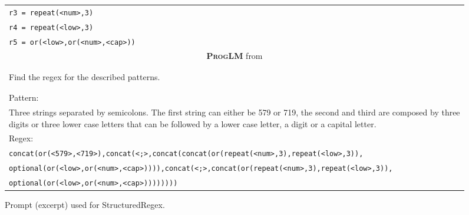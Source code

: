 \documentclass{article}
\theoremstyle{definition}
\newcommand{\pallm}{\textsc{ProgLM}}
\begin{document}
\begin{figure}[h]
\begin{tabularx}{\linewidth}{X}
\tt r3 = repeat(<num>,3) \\
\tt r4 = repeat(<low>,3) \\
\tt r5 = or(<low>,or(<num>,<cap>)) \\
\midrule
    \multicolumn{1}{c}{\textbf{\pallm{}} from \cite{pal} } \\
    \midrule
\\
\\
Find the regex for the described patterns.\\
\\
\\
Pattern:\\
Three strings separated by semicolons. The first string can either be 579 or 719, the second and third are composed by three digits or three lower case letters that can be followed by a lower case letter, a digit or a capital letter.\\
Regex:\\
\tt concat(or(<579>,<719>),concat(<;>,concat(concat(or(repeat(<num>,3),repeat(<low>,3)),\\
\tt optional(or(<low>,or(<num>,<cap>)))),concat(<;>,concat(or(repeat(<num>,3),repeat(<low>,3)),\\
\tt optional(or(<low>,or(<num>,<cap>)))))))) \\
         \bottomrule
    \end{tabularx}
    \caption{Prompt (excerpt) used for {\sc StructuredRegex}. }
\end{figure}
\newpage
\end{document}
